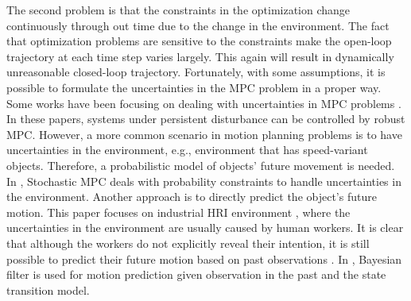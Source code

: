 \documentclass[letterpaper, 10 pt, conference]{ieeeconf}  %
\begin{document}

The second problem is that the constraints in the optimization change continuously through out time due to the change in the environment. The fact that optimization problems are sensitive to the constraints make the open-loop trajectory at each time step varies largely. This again will result in dynamically unreasonable closed-loop trajectory. Fortunately, with some assumptions, it is possible to formulate the uncertainties in the MPC problem in a proper way. Some works have been focusing on dealing with uncertainties in MPC problems  \cite{ chisci2001systems, kuwata2007distributed}. In these papers, systems under persistent disturbance can be controlled by robust MPC. However, a more common scenario in motion planning problems is to have uncertainties in the environment, e.g., environment that has speed-variant objects. Therefore, a probabilistic model of objects' future movement is needed. In \cite{luders2010chance}, Stochastic MPC deals with probability constraints to handle uncertainties in the environment. Another approach is to directly predict the object's future motion. This paper focuses on industrial HRI environment \cite{goodrich2008human, kruse2013human}, where the uncertainties in the environment are usually caused by human workers. It is clear that although the workers do not explicitly reveal their intention, it is still possible to predict their future motion based on past observations \cite{y2018a,butepage2017anticipating}. In \cite{kumar2013learning}, Bayesian filter is used for motion prediction given observation in the past and the state transition model. 
\end{document}
